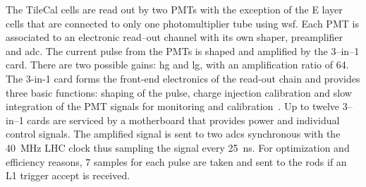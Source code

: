 The TileCal cells are read out by two PMTs with the exception of the E layer
cells that are connected to only one photomultiplier tube using \gls{wsf}. Each
PMT is associated to an electronic read--out channel with its own shaper,
preamplifier and \gls{adc}. The current pulse from the PMTs is shaped and
amplified by the 3--in--1 card. There are two possible gains: \gls{hg} and
\gls{lg}, with an amplification ratio of 64. The 3-in-1 card forms the front-end
electronics of the read-out chain and provides three basic functions: shaping of
the pulse, charge injection calibration and slow integration of the PMT signals
for monitoring and calibration~\cite{TileCal}. Up to twelve 3--in--1 cards are
serviced by a motherboard that provides power and individual control signals.
The amplified signal is sent to two \glspl{adc} synchronous with the 40~MHz LHC
clock thus sampling the signal every 25~ns. For optimization and efficiency
reasons, 7 samples for each pulse are taken and sent to the \glspl{rod} if an L1
trigger accept is received.
